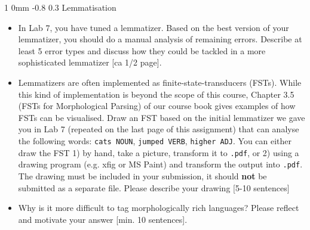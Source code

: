 \documentclass[11pt]{article}
\makeatletter
\newcommand{\newsec}[1]{\section{#1}\noindent}
\renewcommand{\section}{\@startsection
{section}%
{1}%
{0mm}%
{-0.8\baselineskip}%
{0.3\baselineskip}%
{\bfseries\large}}%
\makeatother
\begin{document}
\newsec{Lemmatisation}%

\begin{itemize}
\item In Lab 7, you have tuned a lemmatizer. Based on the best version
  of your lemmatizer, you should do a manual analysis of remaining
  errors. Describe at least 5 error types and discuss how they could
  be tackled in a more sophisticated lemmatizer \textcolor{UUred}{[ca
    1/2 page]}.
\item Lemmatizers are often implemented as finite-state-transducers
  (FSTs). While this kind of implementation is beyond the scope of
  this course, Chapter 3.5 (FSTs for Morphological Parsing) of our
  course book gives examples of how FSTs can be visualised. Draw an
  FST based on the initial lemmatizer we gave you in Lab 7 (repeated
  on the last page of this assignment) that can analyse the following
  words: \texttt{cats NOUN}, \texttt{jumped VERB}, \texttt{higher
    ADJ}. You can either draw the FST 1) by hand, take a picture,
  transform it to \texttt{.pdf}, or 2) using a drawing program
  (e.g. xfig or MS Paint) and transform the output into
  \texttt{.pdf}. The drawing must be included in your submission, it
  should \textbf{not} be submitted as a separate file. Please describe
  your drawing \textcolor{UUred}{[5-10 sentences]}
\item Why is it more difficult to tag morphologically rich languages?
  Please reflect and motivate your answer \textcolor{UUred}{[min. 10
    sentences]}.
\end{itemize}


\end{document}
